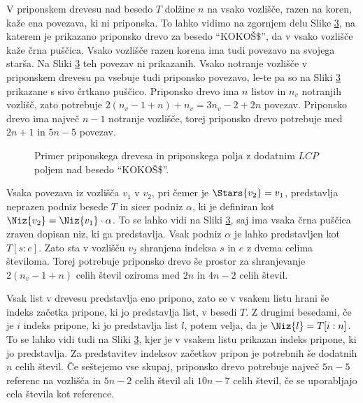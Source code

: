 V priponskem drevesu nad besedo $T$ dolžine $n$ na vsako vozlišče, razen na koren, kaže ena povezava, ki ni priponska. To lahko vidimo na zgornjem delu Slike \ref{fig:SuffuxArray}, na katerem je prikazano priponsko drevo za besedo \enquote{KOKOŠ$\$$}, da v vsako vozlišče kaže črna puščica. Vsako vozlišče razen korena ima tudi povezavo na svojega starša. Na Sliki \ref{fig:SuffuxArray} teh povezav ni prikazanih. Vsako notranje vozlišče v priponskem drevesu pa vsebuje tudi priponsko povezavo, le-te pa so na Sliki \ref{fig:SuffuxArray} prikazane s sivo črtkano puščico. Priponsko drevo ima $n$ listov in $n_v$ notranjih vozlišč, zato potrebuje $2(n_v-1+n)+n_v= 3n_v-2+2n$ povezav. Priponsko drevo ima največ $n-1$ notranje vozlišče, torej priponsko drevo potrebuje med $2n+1$ in $5n -5$ povezav.

\begin{figure}[htb]
    \begin{subfigure}[t]{\linewidth}
        
        
        \centering
        \subcaption*{}
        \label{fig:bSADrevo}
    \end{subfigure}
    \begin{subfigure}[t]{1\linewidth}        
        
        \centering
        \subcaption*{}
        \label{fig:bSAPolje}
    \end{subfigure}
    \caption{Primer priponskega drevesa in priponskega polja z dodatnim $LCP$ poljem nad besedo \enquote{KOKOŠ\$}.} 
    \label{fig:SuffuxArray}
\end{figure}

Vsaka povezava iz vozlišča $v_1$ v $v_2$, pri čemer je $\Stars{v_2}=v_1$, predstavlja neprazen podniz besede $T$ in sicer podniz $\alpha$, ki je definiran kot $\Niz{v_2}=\Niz{v_1}\cdot\alpha$. To se lahko vidi na Sliki \ref{fig:SuffuxArray}, saj ima vsaka črna puščica zraven dopisan niz, ki ga predstavlja. Vsak podniz $\alpha$ je lahko predstavljen kot $T[s:e]$. Zato sta v vozlišču $v_2$ shranjena indeksa $s$ in $e$ z dvema celima številoma. Torej potrebuje priponsko drevo še prostor za shranjevanje $2(n_v-1+n)$ celih števil oziroma med $2n$ in $4n-2$ celih števil.

Vsak list v drevesu predstavlja eno pripono, zato se v vsakem listu hrani še indeks začetka pripone, ki jo predstavlja list, v besedi $T$. Z drugimi besedami, če je $i$ indeks pripone, ki jo predstavlja list $l$, potem velja, da je $\Niz{l}=T[i:n]$. To se lahko vidi tudi na Sliki \ref{fig:SuffuxArray}, kjer je v vsakem listu prikazan indeks pripone, ki jo predstavlja. Za predstavitev indeksov začetkov pripon je potrebnih še dodatnih $n$ celih števil. Če seštejemo vse skupaj, priponsko drevo potrebuje največ $5n-5$ referenc na vozlišča in $5n-2$ celih števil ali $10n-7$ celih števil, če se uporabljajo cela števila kot reference.

